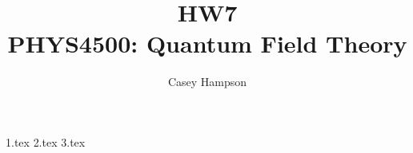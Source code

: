 \documentclass[titlepage]{article}
\title{HW7 \\[5pt] PHYS4500: Quantum Field Theory}
\author{Casey Hampson}
\begin{document}
    \maketitle
    \pagebreak

    {1.tex}
    {2.tex} 
    {3.tex} 
\end{document}
